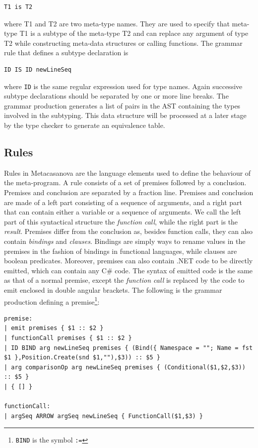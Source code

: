 \begin{lstlisting}
T1 is T2
\end{lstlisting}

where T1 and T2 are two meta-type names. They are used to specify that meta-type T1 is a subtype of the meta-type T2 and can replace any argument of type T2 while constructing meta-data structures or calling functions. The grammar rule that defines a subtype declaration is

\begin{lstlisting}
ID IS ID newLineSeq
\end{lstlisting}

\noindent
where \texttt{ID} is the same regular expression used for type names. Again successive subtype declarations should be separated by one or more line breaks. The grammar production generates a list of pairs in the AST containing the types involved in the subtyping. This data structure will be processed at a later stage by the type checker to generate an equivalence table.

\subsection{Rules}
\label{sec:ch_metacasanova_parser_rules}
Rules in Metacasanova are the language elements used to define the behaviour of the meta-program. A rule consists of a set of premises followed by a conclusion. Premises and conclusion are separated by a fraction line. Premises and conclusion are made of a left part consisting of a sequence of arguments, and a right part that can contain either a variable or a sequence of arguments. We call the left part of this syntactical structure the \textit{function call}, while the right part is the \textit{result}. Premises differ from the conclusion as, besides function calls, they can also contain \textit{bindings} and \textit{clauses}. Bindings are simply ways to rename values in the premises in the fashion of bindings in functional languages, while clauses are boolean predicates. Moreover, premises can also contain .NET code to be directly emitted, which can contain any C\# code. The syntax of emitted code is the same as that of a normal premise, except the \textit{function call} is replaced by the code to emit enclosed in double angular brackets. The following is the grammar production defining a premise\footnote{ \texttt{BIND} is the symbol \texttt{:=}}:

\begin{lstlisting}
premise:
| emit premises { $1 :: $2 }
| functionCall premises { $1 :: $2 }
| ID BIND arg newLineSeq premises { (Bind({ Namespace = ""; Name = fst $1 },Position.Create(snd $1,""),$3)) :: $5 }
| arg comparisonOp arg newLineSeq premises { (Conditional($1,$2,$3)) :: $5 }
| { [] }

functionCall:
| argSeq ARROW argSeq newLineSeq { FunctionCall($1,$3) }
\end{lstlisting}

